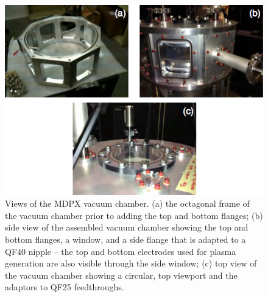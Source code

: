 
\begin{figure}[h!]
\begin{center}
\includegraphics[width=5in]{figures/chamber.png}
\caption{Views of the MDPX vacuum chamber. (a) the octagonal frame of the vacuum chamber prior to adding the top and bottom flanges; (b) side view of the assembled vacuum chamber showing the top and bottom flanges, a window, and a side flange that is adapted to a QF40 nipple -- the top and bottom electrodes used for plasma generation are also visible through the side window; (c) top view of the vacuum chamber showing a circular, top viewport and the adaptors to QF25 feedthroughs\cite{PLA:9579370}.\label{chamber}}
\end{center}
\end{figure}

